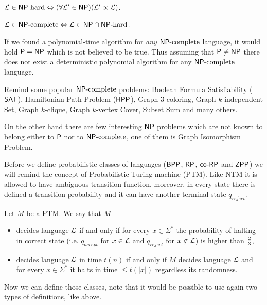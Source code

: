 		\begin{defn}
			${\cal L}\in\NPH \iff (\forall{\cal L'}\in\NP)({\cal L'}\propto{\cal L})$.
		\end{defn}
		
		\begin{defn}
			${\cal L}\in\NPC\iff{\cal L}\in\NP\cap\NPH$.
		\end{defn}
		
		\begin{note}
			If we found a polynomial-time algorithm for {\em any} $\NPC$ language, it would hold $\P=\NP$ which is not believed to be true. Thus assuming that $\P\neq\NP$ there does not exist a deterministic polynomial algorithm for any $\NPC$ language.
		\end{note}
		
		\begin{example}\label{exm:npc}
			Remind some popular $\NPC$ problems: Boolean Formula Satisfiability ($\sf SAT$), Hamiltonian Path Problem ($\sf HPP$), Graph $3$-coloring, Graph $k$-independent Set, Graph $k$-clique, Graph $k$-vertex Cover, Subset Sum and many others.
			
			On the other hand there are few interesting $\NP$ problems which are not known to belong either to $\P$ nor to $\NPC$, one of them is Graph Isomorphism Problem.
		\end{example}
		
		
		Before we define probabilistic classes of languages ($\BPP$, $\RP$, $\coRP$ and $\ZPP$) we will remind the concept of Probabilistic Turing machine (PTM). Like NTM it is allowed to have ambiguous transition function, moreover, in every state there is defined a transition probability and it can have another terminal state $q_{reject}$.
		
		Let $M$ be a PTM. We say that $M$
		\begin{itemize}
			\item decides language $\cal L$ if and only if for every $x\in\Sigma^*$ the probability of halting in correct state (i.e. $q_{accept}$ for $x\in{\cal L}$ and $q_{reject}$ for $x\notin{\cal L}$) is higher than $\nicefrac{2}{3}$,
			\item decides language $\cal L$ in time $t(n)$ if and only if $M$ decides language $\cal L$ and for every $x\in\Sigma^*$ it halts in time $\leq t(|x|)$ regardless its randomness.
		\end{itemize}
		Now we can define those classes, note that it would be possible to use again two types of definitions, like above.
		
